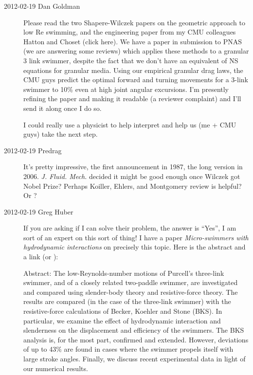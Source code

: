 \begin{description}

\item[2012-02-19 Dan Goldman]
Please read the two Shapere-Wilczek papers on the
geometric approach to low Re swimming, and the engineering paper from my
CMU colleagues Hatton and Choset (click
{here}). We have a paper in submission to PNAS (we are answering some
reviews) which applies these methods to a granular 3 link swimmer,
despite the fact that we don't have an equivalent of NS equations for
granular media. Using our empirical granular drag laws, the CMU guys
predict the optimal forward and turning movements for a 3-link swimmer to
10\% even at high joint angular excursions. I'm presently refining the
paper and making it readable (a reviewer complaint) and I'll send it
along once I do so.

I could really use a physicist to help interpret and help us (me + CMU
guys) take the next step.


\item[2012-02-19 Predrag] It's pretty impressive, the first
announcement in 1987, the long version in
2006. {\em J. Fluid. Mech.} decided it might be good enough once Wilczek
got Nobel Prize?
Perhaps Koiller, Ehlers, and Montgomery review is helpful?
Or ?

\item[2012-02-19 Greg Huber]
If you are asking if I can solve their problem, the answer is ``Yes'', I
am sort of an expert on this sort of thing! I have a paper
{\em Micro-swimmers with hydrodynamic interactions} on precisely this
topic. Here is the abstract and a
{link} (or
):

Abstract:  The low-Reynolds-number motions of Purcell's three-link
swimmer, and of a closely related two-paddle swimmer, are investigated
and compared using slender-body theory and resistive-force theory. The
results are compared (in the case of the three-link swimmer) with the
resistive-force calculations of Becker, Koehler and Stone
(BKS). In particular, we examine the effect of hydrodynamic interaction
and slenderness on the displacement and efficiency of the swimmers. The
BKS analysis is, for the most part, confirmed and extended. However,
deviations of up to 43\% are found in cases where the swimmer propels
itself with large stroke angles. Finally, we discuss recent experimental
data in light of our numerical results.


\end{description}
